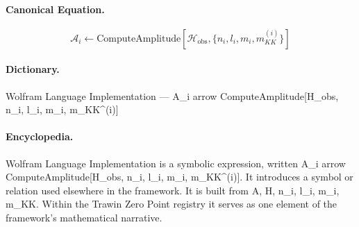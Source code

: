 \paragraph{Canonical Equation.}
\[
\mathcal{A}_i \leftarrow \text{ComputeAmplitude}[\mathcal{H}_{\text{obs}}, \{n_i, l_i, m_i, m_{KK}^{(i)}\}]
\]

\paragraph{Dictionary.}
Wolfram Language Implementation — A\_i arrow ComputeAmplitude[H\_obs, n\_i, l\_i, m\_i, m\_KK\textasciicircum{}(i)]

\paragraph{Encyclopedia.}
Wolfram Language Implementation is a symbolic expression, written A\_i arrow ComputeAmplitude[H\_obs, n\_i, l\_i, m\_i, m\_KK\textasciicircum{}(i)]. It introduces a symbol or relation used elsewhere in the framework. It is built from A, H, n\_i, l\_i, m\_i, m\_KK. Within the Trawin Zero Point registry it serves as one element of the framework's mathematical narrative.
